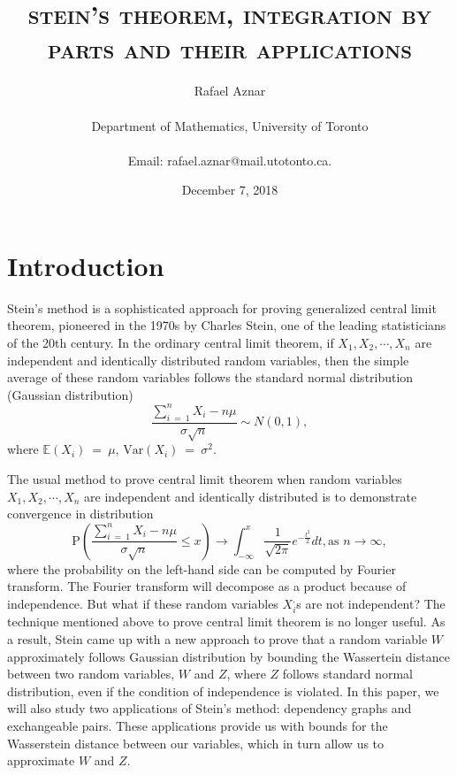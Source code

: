 \documentclass[12pt]{article}
\newcommand{\eq }{\: = \:}
\theoremstyle{nonumberplain}
\begin{document}
\title{\vspace{2cm}\textsc{stein's theorem, integration by parts and their applications}}
\author
{Rafael Aznar\\
\\
\normalsize{Department of Mathematics, University of Toronto}\\
\\
\normalsize{Email:  rafael.aznar@mail.utotonto.ca.}
}

\date{December 7, 2018}
\maketitle

\thispagestyle{empty}

\clearpage

\tableofcontents


\pagebreak

\section*{Introduction}

Stein's method is a sophisticated approach for proving generalized central limit theorem, pioneered in the 1970s by Charles Stein, one of the leading statisticians of the 20th century. In the ordinary central limit theorem, if $X_{1}, X_{2}, \cdots, X_{n}$ are independent and identically distributed random variables, then the simple average of these random variables follows the standard normal distribution (Gaussian distribution)
$$
\frac{\sum_{i\eq 1}^{n}X_{i}-n\mu}{\sigma \sqrt{n}} \sim N(0,1),
$$
where $\mathbb{E}(X_{i})\eq \mu$, $\mathrm{Var}(X_{i})\eq \sigma^{2}$.

The usual method to prove central limit theorem when random variables $X_{1}, X_{2}, \cdots, X_{n}$ are independent and identically distributed is to demonstrate convergence in distribution 
$$
\mathrm{P}(\frac{\sum_{i\eq 1}^{n}X_{i}-n\mu}{\sigma \sqrt{n}}\leq x)\longrightarrow \int_{-\infty}^{x} \frac{1}{\sqrt{2\pi}}e^{-\frac{t^{2}}{2}}dt, \mbox{as } n\rightarrow \infty,
$$ 
where the probability on the left-hand side can be computed by Fourier transform. The Fourier transform will decompose as a product because of independence. But what if these random variables $X_{i}^{,}$s are not independent? The technique mentioned above to prove central limit theorem is no longer useful. As a result, Stein came up with a new approach to prove that a random variable $W$ approximately follows Gaussian distribution by bounding the Wassertein distance between two random variables, $W$ and $Z$, where $Z$ follows standard normal distribution, even if the condition of independence is violated. In this paper, we will also study two applications of Stein's method: dependency graphs and exchangeable pairs. These applications provide us with bounds for the Wasserstein distance between our variables, which in turn allow us to approximate $W$ and $Z$. 
\end{document}
